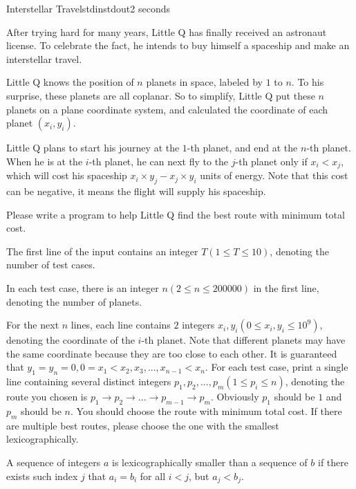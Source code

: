 \documentclass[11pt,a4paper,oneside]{article}
\newcommand{\timeLimit}{2 seconds}
\begin{document}
\begin{problem}{Interstellar Travel}{stdin}{stdout}{\timeLimit}

After trying hard for many years, Little Q has finally received an astronaut license. To celebrate the fact, he intends to buy himself a spaceship and make an interstellar travel.\par
Little Q knows the position of $n$ planets in space, labeled by $1$ to $n$. To his surprise, these planets are all coplanar. So to simplify, Little Q put these $n$ planets on a plane coordinate system, and calculated the coordinate of each planet $(x_i,y_i)$.\par
Little Q plans to start his journey at the $1$-th planet, and end at the $n$-th planet. When he is at the $i$-th planet, he can next fly to the $j$-th planet only if $x_i<x_j$, which will cost his spaceship $x_i\times y_j-x_j\times y_i$ units of energy. Note that this cost can be negative, it means the flight will supply his spaceship.\par
Please write a program to help Little Q find the best route with minimum total cost.

\InputFile
The first line of the input contains an integer $T(1\leq T\leq10)$, denoting the number of test cases.\par
In each test case, there is an integer $n(2\leq n\leq 200000)$ in the first line, denoting the number of planets.\par
For the next $n$ lines, each line contains $2$ integers $x_i,y_i(0\leq x_i,y_i\leq 10^9)$, denoting the coordinate of the $i$-th planet. Note that different planets may have the same coordinate because they are too close to each other. It is guaranteed that $y_1=y_n=0,0=x_1<x_2,x_3,...,x_{n-1}<x_n$.
\OutputFile
For each test case, print a single line containing several distinct integers $p_1,p_2,...,p_m(1\leq p_i\leq n)$, denoting the route you chosen is $p_1\rightarrow p_2\rightarrow...\rightarrow p_{m-1}\rightarrow p_m$. Obviously $p_1$ should be $1$ and $p_m$ should be $n$. You should choose the route with minimum total cost. If there are multiple best routes, please choose the one with the smallest lexicographically.\par
A sequence of integers $a$ is lexicographically smaller than a sequence of $b$ if there exists such index $j$ that $a_i = b_i$ for all $i < j$, but $a_j < b_j$.

\Examples
\begin{example}
%
\end{example}
\end{problem}
\end{document}
